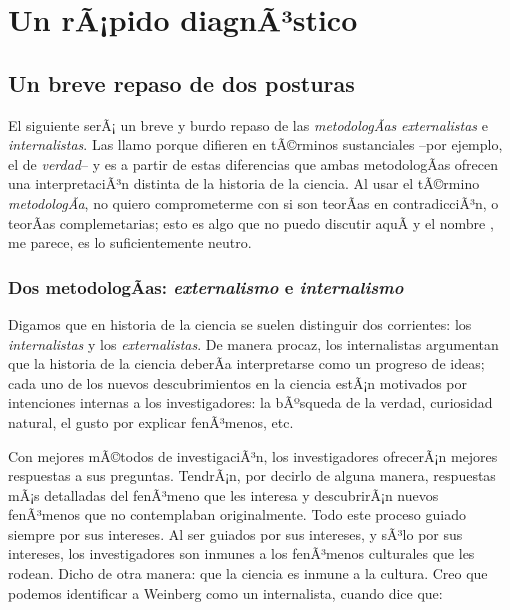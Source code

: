 
\chapter{Un rÃ¡pido diagnÃ³stico}

\section{Un breve repaso de dos posturas}

\noindent El siguiente serÃ¡ un breve y burdo repaso de las
\emph{metodologÃ­as} \emph{externalistas} e \emph{internalistas}. 
Las llamo  porque difieren en tÃ©rminos sustanciales
--por ejemplo, el de \emph{verdad}-- y es a partir de estas diferencias
que ambas metodologÃ­as ofrecen una interpretaciÃ³n distinta de la historia
de la ciencia. Al usar el tÃ©rmino \emph{metodologÃ­a}, no quiero
comprometerme con si son teorÃ­as en contradicciÃ³n, o teorÃ­as
complemetarias; esto es algo que no puedo discutir aquÃ­ y el nombre
, me parece, es lo suficientemente neutro.


\subsection{Dos metodologÃ­as: \emph{externalismo} e \emph{internalismo}}

\noindent Digamos que en historia de la ciencia se suelen distinguir dos
corrientes: los \emph{internalistas} y los \emph{externalistas}. De manera
procaz, los internalistas argumentan que la historia de la ciencia deberÃ­a
interpretarse como un progreso de ideas; cada uno de los nuevos
descubrimientos en la ciencia estÃ¡n motivados por intenciones internas
a los investigadores: la bÃºsqueda de la verdad, curiosidad natural, el
gusto por explicar fenÃ³menos, etc.

Con mejores mÃ©todos de investigaciÃ³n, los investigadores ofrecerÃ¡n mejores respuestas a sus preguntas.
TendrÃ¡n, por decirlo de alguna manera, respuestas mÃ¡s detalladas del fenÃ³meno que les interesa y descubrirÃ¡n nuevos fenÃ³menos que no contemplaban originalmente.
Todo este proceso guiado siempre por sus intereses.
Al ser guiados por sus intereses, y sÃ³lo por sus intereses, los investigadores son inmunes a los fenÃ³menos culturales que les rodean.
Dicho de otra manera: que la ciencia es inmune a la cultura. Creo que
podemos identificar a Weinberg como
un internalista, cuando dice que:

